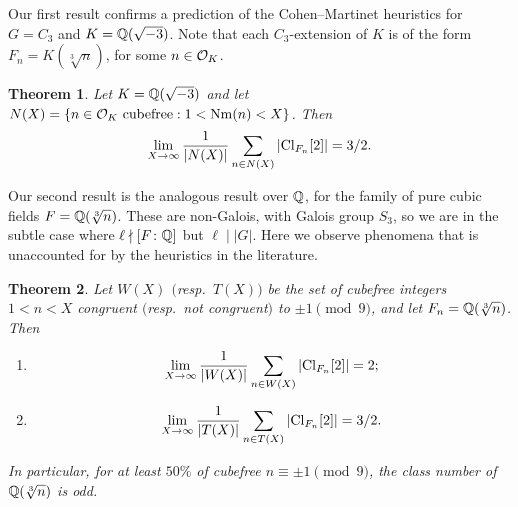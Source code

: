 \documentclass[11pt,a4paper]{amsart}
\def\Q{{\rm \mathbb{Q}}}
\def\O{{\rm \mathcal{O}}}
\def\Nm{{\rm Nm}}
\def\Cl{{\rm Cl}}
\numberwithin{equation}{section}
\newtheorem{theorem}{Theorem}[section]
\begin{document}
    
Our first result confirms a prediction of the Cohen--Martinet heuristics for $G = C_3$ and $K = \Q(\sqrt{-3})$.  Note that each $C_3$-extension of $K$ is of the form $F_n = K(\sqrt[3]{n})$, for some $n \in \O_K$. 

\begin{theorem}\label{thm: over Q(omega)}
    Let $K = \Q(\sqrt{-3})$ and let $N(X) = \{n \in \O_K \mbox{ cubefree}: 1 < \Nm(n) < X\}$. Then 
    \[\displaystyle\lim_{X \to \infty}\frac{1}{|N(X)|} \sum_{n \in N(X)} |\Cl_{F_n}[2]| = 3/2.\]
\end{theorem}



Our second result is the analogous result over $\Q$, for the family of pure cubic fields $F = \Q(\sqrt[3]{n})$.  These are non-Galois, with Galois group $S_3$, so we are in the subtle case where $\ell \nmid [F \colon \Q]$ but $\ell \mid |G|$. Here we observe phenomena that is unaccounted for by the heuristics in the literature. 
\begin{theorem}\label{main thm: over Q} Let $W(X)$ $($resp.\ $T(X))$ be the set of cubefree integers $1 < n < X$ congruent $($resp.\ not congruent$)$ to $\pm1\pmod{9}$, and let $F_n = \Q(\sqrt[3]{n})$. Then

    \begin{enumerate}
        \item \[\lim_{X \to \infty}\frac{1}{|W(X)|} \sum_{n \in W(X)} |\Cl_{F_n}[2]| = 2;\]
        \item \[\lim_{X \to \infty}\frac{1}{|T(X)|} \sum_{n \in T(X)} |\Cl_{F_n}[2]| = 3/2.\]
    \end{enumerate}
In particular, for at least $50\%$ of cubefree $n \equiv \pm 1\pmod9$, the class number of $\Q(\sqrt[3]{n})$ is odd.
\end{theorem}
\end{document}
